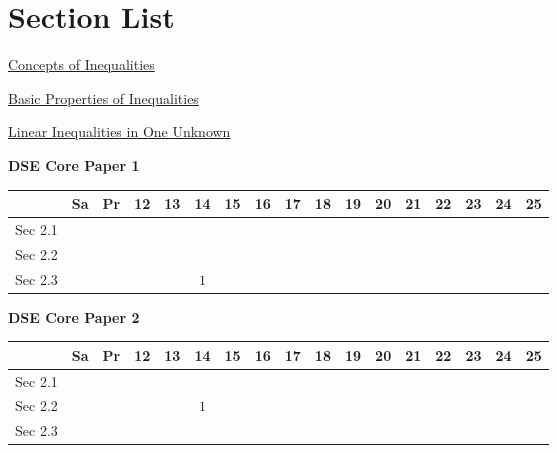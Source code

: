 \documentclass[12pt, a4paper]{article}
\begin{document}
\section*{Section List}
\begin{enumx}[label=Sec 2.\arabic*\ ]
\item \hyperref[section:3-2-1]{Concepts of Inequalities}
\item \hyperref[section:3-2-2]{Basic Properties of Inequalities}
\item \hyperref[section:3-2-3]{Linear Inequalities in One Unknown}
\end{enumx}
\begin{absolutelynopagebreak}
\begin{center}
\textbf{DSE Core Paper 1}
\end{center}
\begin{center}
\begin{tabular}{|l|c|c|c|c|c|c|c|c|c|c|c|c|c|c|c|c|}
\hline
        & Sa & Pr & 12 & 13 & 14 & 15 & 16 & 17 & 18 & 19 & 20 & 21 & 22 & 23 & 24 & 25 \\\hline\hline
Sec 2.1 &  &  &  &  &  &  &  &  &  &  &  &  &  &  &  &  \\\hline
Sec 2.2 &  &  &  &  &  &  &  &  &  &  &  &  &  &  &  &  \\\hline
Sec 2.3 &  &  &  &  &  $1$ &  &  &  &  &  &  &  &  &  &  &  \\\hline
\end{tabular}
\end{center}
\end{absolutelynopagebreak}
\begin{absolutelynopagebreak}
\begin{center}
\textbf{DSE Core Paper 2}
\end{center}
\begin{center}
\begin{tabular}{|l|c|c|c|c|c|c|c|c|c|c|c|c|c|c|c|c|}
\hline
        & Sa & Pr & 12 & 13 & 14 & 15 & 16 & 17 & 18 & 19 & 20 & 21 & 22 & 23 & 24 & 25 \\\hline\hline
Sec 2.1 &  &  &  &  &  &  &  &  &  &  &  &  &  &  &  &  \\\hline
Sec 2.2 &  &  &  &  &  $1$ &  &  &  &  &  &  &  &  &  &  &  \\\hline
Sec 2.3 &  &  &  &  &  &  &  &  &  &  &  &  &  &  &  &  \\\hline
\end{tabular}
\end{center}
\end{absolutelynopagebreak}
\end{document}
